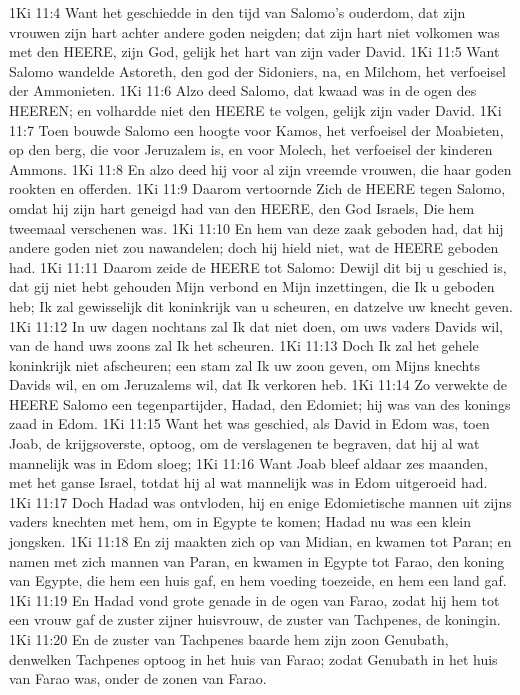 1Ki 11:4  Want het geschiedde in den tijd van Salomo's ouderdom, dat zijn vrouwen zijn hart achter andere goden neigden; dat zijn hart niet volkomen was met den HEERE, zijn God, gelijk het hart van zijn vader David.
1Ki 11:5  Want Salomo wandelde Astoreth, den god der Sidoniers, na, en Milchom, het verfoeisel der Ammonieten.
1Ki 11:6  Alzo deed Salomo, dat kwaad was in de ogen des HEEREN; en volhardde niet den HEERE te volgen, gelijk zijn vader David.
1Ki 11:7  Toen bouwde Salomo een hoogte voor Kamos, het verfoeisel der Moabieten, op den berg, die voor Jeruzalem is, en voor Molech, het verfoeisel der kinderen Ammons.
1Ki 11:8  En alzo deed hij voor al zijn vreemde vrouwen, die haar goden rookten en offerden.
1Ki 11:9  Daarom vertoornde Zich de HEERE tegen Salomo, omdat hij zijn hart geneigd had van den HEERE, den God Israels, Die hem tweemaal verschenen was.
1Ki 11:10  En hem van deze zaak geboden had, dat hij andere goden niet zou nawandelen; doch hij hield niet, wat de HEERE geboden had.
1Ki 11:11  Daarom zeide de HEERE tot Salomo: Dewijl dit bij u geschied is, dat gij niet hebt gehouden Mijn verbond en Mijn inzettingen, die Ik u geboden heb; Ik zal gewisselijk dit koninkrijk van u scheuren, en datzelve uw knecht geven.
1Ki 11:12  In uw dagen nochtans zal Ik dat niet doen, om uws vaders Davids wil, van de hand uws zoons zal Ik het scheuren.
1Ki 11:13  Doch Ik zal het gehele koninkrijk niet afscheuren; een stam zal Ik uw zoon geven, om Mijns knechts Davids wil, en om Jeruzalems wil, dat Ik verkoren heb.
1Ki 11:14  Zo verwekte de HEERE Salomo een tegenpartijder, Hadad, den Edomiet; hij was van des konings zaad in Edom.
1Ki 11:15  Want het was geschied, als David in Edom was, toen Joab, de krijgsoverste, optoog, om de verslagenen te begraven, dat hij al wat mannelijk was in Edom sloeg;
1Ki 11:16  Want Joab bleef aldaar zes maanden, met het ganse Israel, totdat hij al wat mannelijk was in Edom uitgeroeid had.
1Ki 11:17  Doch Hadad was ontvloden, hij en enige Edomietische mannen uit zijns vaders knechten met hem, om in Egypte te komen; Hadad nu was een klein jongsken.
1Ki 11:18  En zij maakten zich op van Midian, en kwamen tot Paran; en namen met zich mannen van Paran, en kwamen in Egypte tot Farao, den koning van Egypte, die hem een huis gaf, en hem voeding toezeide, en hem een land gaf.
1Ki 11:19  En Hadad vond grote genade in de ogen van Farao, zodat hij hem tot een vrouw gaf de zuster zijner huisvrouw, de zuster van Tachpenes, de koningin.
1Ki 11:20  En de zuster van Tachpenes baarde hem zijn zoon Genubath, denwelken Tachpenes optoog in het huis van Farao; zodat Genubath in het huis van Farao was, onder de zonen van Farao.
